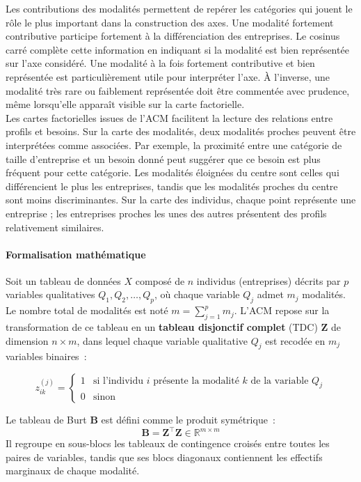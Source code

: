 \documentclass[12pt, a4paper, oneside]{report}
\begin{document}
\begin{enumerate}
	Les contributions des modalités permettent de repérer les catégories qui jouent le rôle le plus important dans la construction des axes. Une modalité fortement contributive participe fortement à la différenciation des entreprises. Le cosinus carré complète cette information en indiquant si la modalité est bien représentée sur l’axe considéré. Une modalité à la fois fortement contributive et bien représentée est particulièrement utile pour interpréter l’axe. À l’inverse, une modalité très rare ou faiblement représentée doit être commentée avec prudence, même lorsqu’elle apparaît visible sur la carte factorielle.\\
	
	Les cartes factorielles issues de l’ACM facilitent la lecture des relations entre profils et besoins. Sur la carte des modalités, deux modalités proches peuvent être interprétées comme associées. Par exemple, la proximité entre une catégorie de taille d’entreprise et un besoin donné peut suggérer que ce besoin est plus fréquent pour cette catégorie. Les modalités éloignées du centre sont celles qui différencient le plus les entreprises, tandis que les modalités proches du centre sont moins discriminantes. Sur la carte des individus, chaque point représente une entreprise ; les entreprises proches les unes des autres présentent des profils relativement similaires.
	\paragraph{Formalisation mathématique}
	Soit un tableau de données $X$ composé de $n$ individus (entreprises) décrits par $p$ variables qualitatives $Q_1, Q_2, \ldots, Q_p$, où chaque variable $Q_j$ admet $m_j$ modalités. Le nombre total de modalités est noté $m = \sum_{j=1}^{p} m_j$. L'ACM repose sur la transformation de ce tableau en un \textbf{tableau disjonctif complet} (TDC) $\mathbf{Z}$ de dimension $n \times m$, dans lequel chaque variable qualitative $Q_j$ est recodée en $m_j$ variables binaires~:
	
	\begin{equation}
		z_{ik}^{(j)} =
		\begin{cases}
			1 & \text{si l'individu } i \text{ présente la modalité } k \text{ de la variable } Q_j \\
			0 & \text{sinon}
		\end{cases}
		\label{eq:tdc}
	\end{equation}
	
	Le tableau de Burt $\mathbf{B}$ est défini comme le produit symétrique~:
	\begin{equation}
		\mathbf{B} = \mathbf{Z}^{\top} \mathbf{Z} \in \mathbb{R}^{m \times m}
		\label{eq:burt}
	\end{equation}
	Il regroupe en sous-blocs les tableaux de contingence croisés entre toutes les paires de variables, tandis que ses blocs diagonaux contiennent les effectifs marginaux de chaque modalité.
	

\end{enumerate}
\end{document}
